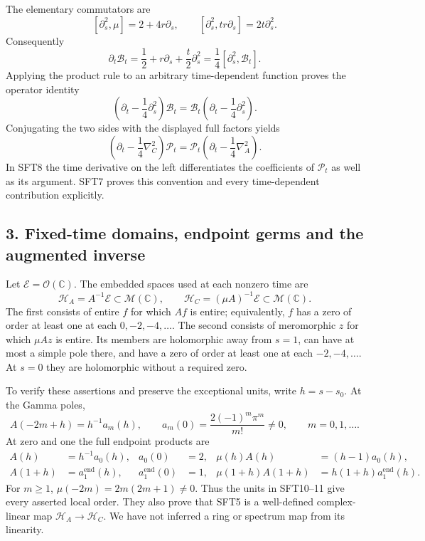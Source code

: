 \documentclass[
  10pt,
  a4paper,
]{article}
\begin{document}
The elementary commutators are \[
 [\partial_s^2,\mu]=2+4r\partial_s,\qquad
 [\partial_s^2,tr\partial_s]=2t\partial_s^2.
\] Consequently \[
 \partial_t\mathcal B_t
   =\frac12+r\partial_s+\frac t2\partial_s^2
   =\frac14[\partial_s^2,\mathcal B_t].
 \tag{SFT7}
\] Applying the product rule to an arbitrary time-dependent function
proves the operator identity \[
 \left(\partial_t-\frac14\partial_s^2\right)\mathcal B_t
   =\mathcal B_t
       \left(\partial_t-\frac14\partial_s^2\right).
\] Conjugating the two sides with the displayed full factors yields \[
 \boxed{\displaystyle
 \left(\partial_t-\frac14\nabla_C^2\right)\mathcal P_t
  =\mathcal P_t
       \left(\partial_t-\frac14\nabla_A^2\right).}
 \tag{SFT8}
\] In SFT8 the time derivative on the left differentiates the
coefficients of \(\mathcal P_t\) as well as its argument. SFT7 proves
this convention and every time-dependent contribution explicitly.

\subsection{3. Fixed-time domains, endpoint germs and the augmented
inverse}\label{fixed-time-domains-endpoint-germs-and-the-augmented-inverse}

Let \(\mathcal E=\mathcal O(\mathbb C)\). The embedded spaces used at
each nonzero time are \[
 \mathcal H_A=A^{-1}\mathcal E\subset\mathcal M(\mathbb C),
 \qquad
 \mathcal H_C=(\mu A)^{-1}\mathcal E
                  \subset\mathcal M(\mathbb C).
 \tag{SFT9}
\] The first consists of entire \(f\) for which \(Af\) is entire;
equivalently, \(f\) has a zero of order at least one at each
\(0,-2,-4,\ldots\). The second consists of meromorphic \(z\) for which
\(\mu Az\) is entire. Its members are holomorphic away from \(s=1\), can
have at most a simple pole there, and have a zero of order at least one
at each \(-2,-4,\ldots\). At \(s=0\) they are holomorphic without a
required zero.

To verify these assertions and preserve the exceptional units, write
\(h=s-s_0\). At the Gamma poles, \[
 A(-2m+h)=h^{-1}a_m(h),\qquad
 a_m(0)=\frac{2(-1)^m\pi^m}{m!}\ne0,\qquad m=0,1,\ldots.
 \tag{SFT10}
\] At zero and one the full endpoint products are \[
 \begin{aligned}
  A(h)&=h^{-1}a_0(h), &a_0(0)&=2,&
  \mu(h)A(h)&=(h-1)a_0(h),\\
  A(1+h)&=a_1^{\mathrm{end}}(h),&
  a_1^{\mathrm{end}}(0)&=1,&
  \mu(1+h)A(1+h)&=h(1+h)a_1^{\mathrm{end}}(h).
 \end{aligned}
 \tag{SFT11}
\] For \(m\ge1\), \(\mu(-2m)=2m(2m+1)\ne0\). Thus the units in SFT10--11
give every asserted local order. They also prove that SFT5 is a
well-defined complex-linear map
\(\mathcal H_A\longrightarrow\mathcal H_C\). We have not inferred a ring
or spectrum map from its linearity.
\end{document}
